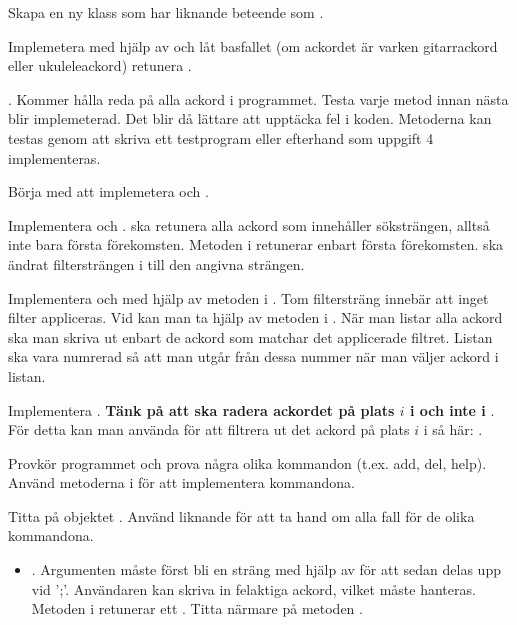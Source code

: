 {\Subtask Skapa en ny klass  som har liknande beteende som .

\Subtask Implemetera  med hjälp av  och låt basfallet (om ackordet är varken gitarrackord eller ukuleleackord) retunera .

\Task {}. Kommer hålla reda på alla ackord i programmet. Testa varje metod innan nästa blir implemeterad. Det blir då lättare att upptäcka fel i koden. Metoderna kan testas genom att skriva ett testprogram eller efterhand som uppgift 4 implementeras.

\Subtask Börja med att implemetera  och .

\Subtask Implementera  och .  ska retunera alla ackord som innehåller söksträngen, alltså inte bara första förekomsten. Metoden  i  retunerar enbart första förekomsten.  ska ändrat filtersträngen i  till den angivna strängen.

\Subtask Implementera  och  med hjälp av metoden  i . Tom filtersträng innebär att inget filter appliceras. Vid  kan man ta hjälp av metoden  i . När man listar alla ackord ska man skriva ut enbart de ackord som matchar det applicerade filtret. Listan ska vara numrerad så att man utgår från dessa nummer när man väljer ackord i listan.

\Subtask Implementera . \textbf{Tänk på att  ska radera ackordet på plats $i$ i  och inte i }. För detta kan man använda  för att filtrera ut det ackord på plats $i$ i  så här: .

\Task {}

\Subtask Provkör programmet och prova några olika kommandon (t.ex. add, del, help). Använd metoderna i  för att implementera kommandona.

\Subtask Titta på objektet . Använd liknande  för att ta hand om alla fall för de olika kommandona.

\begin{itemize}
\item {}. Argumenten måste först bli en sträng med hjälp av  för att sedan delas upp vid ';'. Användaren kan skriva in felaktiga ackord, vilket måste hanteras. Metoden  i  retunerar ett . Titta närmare på metoden .


\end{itemize}}
